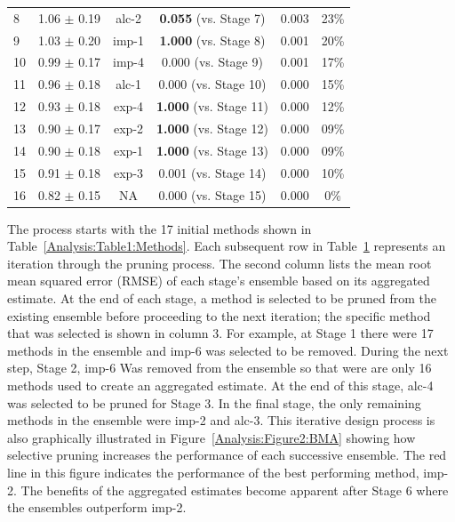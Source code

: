 \documentclass[journal=jpcbfk, manuscript=article]{achemso}
\newcommand{\+}[1]{\ensuremath{\mathbf{#1}}}
\begin{document}
\begin{table}[t!]
\begin{tabular}{l|c|c|c|c|c}
		 8 & 1.06 $\pm$ 0.19 & alc-2 & \textbf{0.055}  (vs. Stage 7) & 0.003 & 23\%\\
		 9 & 1.03 $\pm$ 0.20 & imp-1 & \textbf{1.000}  (vs. Stage 8)& 0.001 & 20\%\\
		 10 & 0.99 $\pm$ 0.17 & imp-4 & 0.000  (vs. Stage 9)& 0.001 & 17\%\\
		 11 & 0.96 $\pm$ 0.18 & alc-1 & 0.000  (vs. Stage 10) & 0.000 & 15\%\\														
		 12 & 0.93 $\pm$ 0.18 & exp-4 &  \textbf{1.000}  (vs. Stage 11)& 0.000 & 12\%\\
		 13 & 0.90 $\pm$ 0.17 & exp-2 & \textbf{1.000}  (vs. Stage 12) &0.000 &  09\%\\															
		 14 & 0.90 $\pm$ 0.18 & exp-1 & \textbf{1.000}   (vs. Stage 13)& 0.000 & 09\%\\															
		 15 & 0.91 $\pm$ 0.18 & exp-3 &   0.001 (vs. Stage 14)&  0.000  & 10\%\\																
		 16 & 0.82 $\pm$ 0.15 & NA  & 0.000   (vs. Stage 15)&0.000 &  0\%\\
		\hline
		\hline
	\end{tabular}
	\label{Analysis:Table2:BMA}
\end{table}
The process starts with the 17 initial methods shown in Table~\ref{Analysis:Table1:Methods}.
Each subsequent row in Table~\ref{Analysis:Table2:BMA} represents an iteration through the pruning process.
The second column lists the mean root mean squared error (RMSE) of each stage's ensemble based on its aggregated estimate.
At the end of each stage, a method is selected to be pruned from the existing ensemble before proceeding to the next iteration; the specific method that was selected is shown in column 3.
For example, at Stage 1 there were 17 methods in the ensemble and imp-6 was selected to be removed.
During the next step, Stage 2, imp-6 Was removed from the ensemble so that were are only 16 methods used to create an aggregated estimate.
At the end of this stage, alc-4 was selected to be pruned for Stage 3.
In the final stage, the only remaining methods in the ensemble were imp-2 and alc-3.
This iterative design process is also graphically illustrated in Figure~\ref{Analysis:Figure2:BMA} showing how selective pruning increases the performance of each successive ensemble.
The red line in this figure indicates the performance of the best performing method, imp-2.
The benefits of the aggregated estimates become apparent after Stage 6 where the ensembles outperform imp-2.
\end{document}
